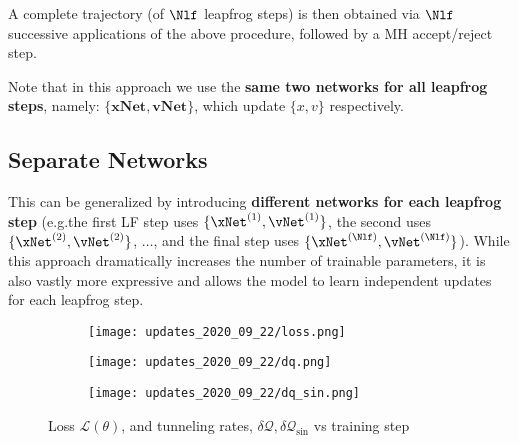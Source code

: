 A complete trajectory (of \(\Nlf\) leapfrog steps) is then obtained via
\(\Nlf\) successive applications of the above procedure, followed by a MH
accept/reject step.

Note that in this approach we use the \textbf{same two networks for all
leapfrog steps}, namely: \(\{\mathrm{\mathbf{xNet}}, \mathrm{\mathbf{vNet}}\}\),
which update \(\{x, v\}\) respectively.
%
\subsection{Separate Networks}%
\label{subsec:separate_networks}
%
This can be generalized by introducing \textbf{different networks for each
leapfrog step} (e.g.\@ the first LF step uses \(\{\xNet^{(1)},
\vNet^{(1)}\}\), the second uses \(\{\xNet^{(2)}, \vNet^{(2)}\}\), \(\ldots\), and
the final step uses \(\{\xNet^{(\Nlf)}, \vNet^{(\Nlf)}\}\)).
%
While this approach dramatically increases the number of trainable parameters,
it is also vastly more expressive and allows the model to learn independent
updates for each leapfrog step.
%
\begin{figure}[htpb]
  \centering
  \begin{subfigure}[htpb]{0.3\textwdith}
    \texttt{[image: updates\_2020\_09\_22/loss.png]}
  \end{subfigure}
  \hfill
  \begin{subfigure}[htpb]{0.3\textwdith}
    \texttt{[image: updates\_2020\_09\_22/dq.png]}
  \end{subfigure}
  \hfill
  \begin{subfigure}[htpb]{0.3\textwdith}
    \texttt{[image: updates\_2020\_09\_22/dq\_sin.png]}
  \end{subfigure}
  \caption{Loss \(\mathcal{L}(\theta)\), and tunneling rates, \(\delta
  \mathcal{Q}, \delta\mathcal{Q}_{\sin}\) vs training step}
\end{figure}
%
%
%
